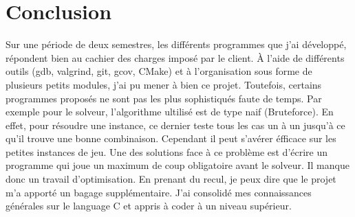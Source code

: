 \documentclass{article}
\begin{document}
\section{Conclusion} 
Sur une p\'eriode de deux semestres, les diff\'erents programmes que j'ai d\'evelopp\'e, r\'epondent bien au cachier des charges impos\'e par le client. \`A l'aide de diff\'erents outils (gdb, valgrind, git, gcov, CMake) et \`a l'organisation sous forme de plusieurs petits modules, j'ai pu mener \`a bien ce projet.
\newline Toutefois, certains programmes propos\'es ne sont pas les plus sophistiqu\'es faute de temps. Par exemple pour le solveur, l'algorithme ultilis\'e est de type naif (Bruteforce). En effet, pour r\'esoudre une instance, ce dernier teste tous les cas un \`a un jusqu'\`a ce qu'il trouve une bonne combinaison. Cependant il peut s'av\'erer \'efficace sur les petites instances de jeu. Une des solutions face \`a ce probl\`eme est d'\'ecrire un programme qui joue un maximum de coup obligatoire avant le solveur. Il manque donc un travail d'optimisation.
\newline En prenant du recul, je peux dire que le projet m'a apport\'e un bagage supplémentaire. J'ai consolid\'e mes connaissances g\'en\'erales sur le language C et appris \`a coder \`a un niveau sup\'erieur.
\end{document}
